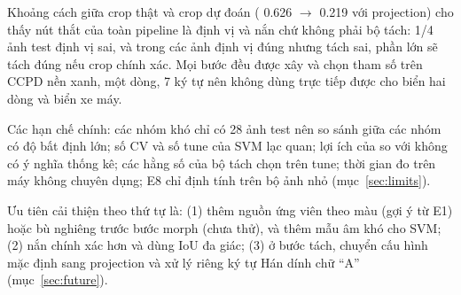 Khoảng cách giữa crop thật và crop dự đoán ( 0.626 $\to$ 0.219 với projection) cho thấy nút thắt của toàn pipeline là định vị và nắn chứ không phải bộ tách: 1/4 ảnh test định vị sai, và trong các ảnh định vị đúng nhưng tách sai, phần lớn sẽ tách đúng nếu crop chính xác. Mọi bước đều được xây và chọn tham số trên CCPD nền xanh, một dòng, 7 ký tự nên không dùng trực tiếp được cho biển hai dòng và biển xe máy.

Các hạn chế chính: các nhóm khó chỉ có 28 ảnh test nên so sánh giữa các nhóm có độ bất định lớn; số CV và số tune của SVM lạc quan; lợi ích của  so với  không có ý nghĩa thống kê; các hằng số của bộ tách chọn trên tune; thời gian đo trên máy không chuyên dụng; E8 chỉ định tính trên bộ ảnh nhỏ (mục~\ref{sec:limits}).

Ưu tiên cải thiện theo thứ tự là: (1) thêm nguồn ứng viên theo màu (gợi ý từ E1) hoặc bù nghiêng trước bước morph (chưa thử), và thêm mẫu âm khó cho SVM; (2) nắn chính xác hơn và dùng IoU đa giác; (3) ở bước tách, chuyển cấu hình mặc định sang projection và xử lý riêng ký tự Hán dính chữ ``A'' (mục~\ref{sec:future}).

